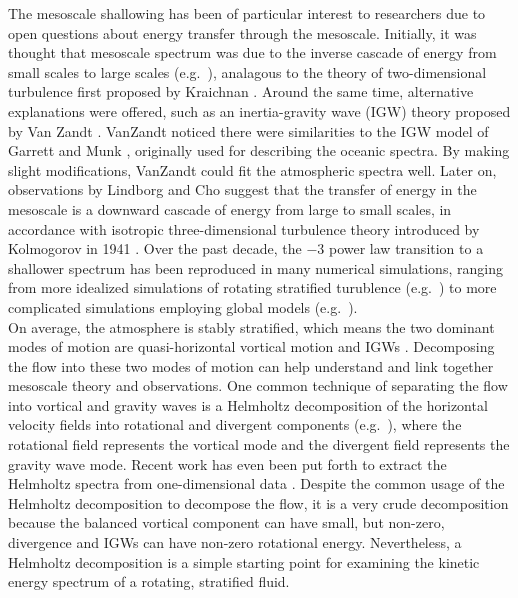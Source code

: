 The mesoscale shallowing has been of particular interest to researchers due to open questions about energy transfer through the mesoscale. Initially, it was thought that mesoscale spectrum was due to the inverse cascade of energy from small scales to large scales (e.g.\ \cite{Gage1979, Lilly1983}), analagous to the theory of two-dimensional turbulence first proposed by Kraichnan \cite{Kraichnan1967} . Around the same time, alternative explanations were offered, such as an inertia-gravity wave (IGW) theory proposed by Van Zandt \cite{VanZandt1982}. VanZandt noticed there were similarities to the IGW model of Garrett and Munk \cite{Garrett1972,Garrett1975}, originally used for describing the oceanic spectra. By making slight modifications, VanZandt could fit the atmospheric spectra well. Later on, observations by Lindborg and Cho \cite{Lindborg2001} suggest that the transfer of energy in the mesoscale is a downward cascade of energy from large to small scales, in accordance with isotropic three-dimensional turbulence theory introduced by Kolmogorov in 1941 \cite{Kolmogorov1991}. Over the past decade, the $-3$ power law transition to a shallower spectrum has been reproduced in many numerical simulations, ranging from more idealized simulations of rotating stratified turublence (e.g.\ \cite{Bartello2010,Kitamura2010}) to more complicated simulations employing global models (e.g.\ \cite{Takahashi2006,Hamilton2008}). \\

On average, the atmosphere is stably stratified, which means the two dominant modes of motion are quasi-horizontal vortical motion and IGWs \cite{Riley2000}. Decomposing the flow into these two modes of motion can help understand and link together mesoscale theory and observations. One common technique of separating the flow into vortical and gravity waves is a Helmholtz decomposition of the horizontal velocity fields into rotational and divergent components (e.g.\ \cite{Cho1999,Waite2009,Waite2013}), where the rotational field represents the vortical mode and the divergent field represents the gravity wave mode. Recent work has even been put forth to extract the Helmholtz spectra from one-dimensional data \cite{Callies2016}. Despite the common usage of the Helmholtz decomposition to decompose the flow, it is a very crude decomposition because the balanced vortical component can have small, but non-zero, divergence and IGWs can have non-zero rotational energy. Nevertheless, a Helmholtz decomposition is a simple starting point for examining the kinetic energy spectrum of a rotating, stratified fluid.\\

